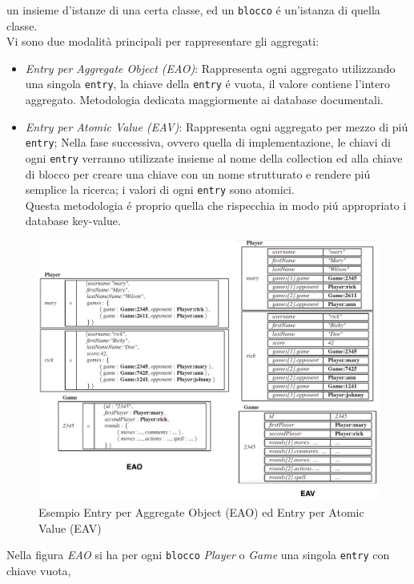un insieme d'istanze di una certa classe, ed un \texttt{blocco} é un'istanza di quella classe.
\\
Vi sono due modalità principali per rappresentare gli aggregati:
\begin{itemize}
    \item \emph{Entry per Aggregate Object (EAO)}: Rappresenta ogni aggregato utilizzando una singola
    \texttt{entry}, la chiave della \texttt{entry} é vuota, il valore contiene l'intero aggregato.
    Metodologia dedicata maggiormente ai database documentali.
    \item \emph{Entry per Atomic Value (EAV)}: Rappresenta ogni aggregato per mezzo di piú \texttt{entry};
    Nella fase successiva, ovvero quella di implementazione, le chiavi di ogni \texttt{entry} verranno utilizzate
    insieme al nome della collection ed alla chiave di blocco per creare una chiave con un
    nome strutturato e rendere piú semplice la ricerca;
    i valori di ogni \texttt{entry} sono atomici.\\
    Questa metodologia é proprio quella che rispecchia in modo piú appropriato i database key-value.
\end{itemize}
\vspace{0.5cm}
\begin{figure}[H]
    \begin{center}
        \includegraphics[width=1\textwidth]{img/eao.eav}
    \end{center}
    \caption{Esempio Entry per Aggregate Object (EAO) ed Entry per Atomic Value (EAV)}
\end{figure}
Nella figura \emph{EAO} si ha per ogni \texttt{blocco} \emph{Player} o \emph{Game} una singola \texttt{entry} con chiave vuota,
